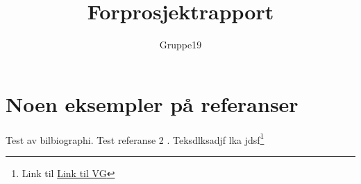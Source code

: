 \documentclass[11pt,a4paper,titlepage]{report}
\author{Gruppe19}
\title{Forprosjektrapport}
\begin{document}
\maketitle
\tableofcontents

\newcommand{\mw}{\emph{Making Waves}}
\newcommand{\es}{\emph{Elasticsearch}}
\newcommand{\rb}{\emph{Redd Barna}}
\newcommand{\cs}{C\nolinebreak\hspace{-.05em}\raisebox{.6ex}{\scriptsize\bf \#}}








\chapter{Noen eksempler på referanser}
Test av bilbiographi\cite{book:unixprog}.
Test referanse 2 \cite{book:unixprog2}.
Teksdlksadjf lka jdsf\footnote{Link til \href{www.vg.no}{Link til VG}}




	
\end{document}
